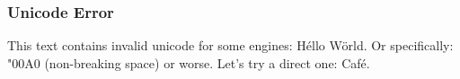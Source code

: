 \begin{frame}
\frametitle{Unicode Error}
This text contains invalid unicode for some engines: Héllo Wörld.
Or specifically: \char"00A0 (non-breaking space) or worse.
Let's try a direct one: Café.
\end{frame}

